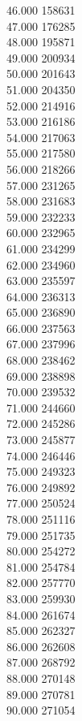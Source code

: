 { 46.000	158631 \\
 47.000	176285 \\
 48.000	195871 \\
 49.000	200934 \\
 50.000	201643 \\
 51.000	204350 \\
 52.000	214916 \\
 53.000	216186 \\
 54.000	217063 \\
 55.000	217580 \\
 56.000	218266 \\
 57.000	231265 \\
 58.000	231683 \\
 59.000	232233 \\
 60.000	232965 \\
 61.000	234299 \\
 62.000	234960 \\
 63.000	235597 \\
 64.000	236313 \\
 65.000	236890 \\
 66.000	237563 \\
 67.000	237996 \\
 68.000	238462 \\
 69.000	238898 \\
 70.000	239532 \\
 71.000	244660 \\
 72.000	245286 \\
 73.000	245877 \\
 74.000	246446 \\
 75.000	249323 \\
 76.000	249892 \\
 77.000	250524 \\
 78.000	251116 \\
 79.000	251735 \\
 80.000	254272 \\
 81.000	254784 \\
 82.000	257770 \\
 83.000	259930 \\
 84.000	261674 \\
 85.000	262327 \\
 86.000	262608 \\
 87.000	268792 \\
 88.000	270148 \\
 89.000	270781 \\
 90.000	271054 \\
}
